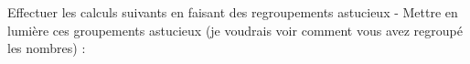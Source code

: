 \documentclass[answers]{exam}
\begin{document}
\begin{questions}
  \question[2.5] Effectuer les calculs suivants en faisant des regroupements astucieux - Mettre en lumière ces groupements astucieux (je voudrais voir comment vous avez regroupé les nombres) :
\end{questions}
\end{document}
